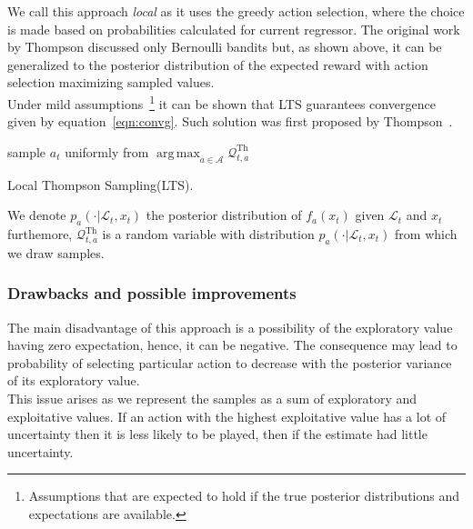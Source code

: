 \documentclass[12pt, a4paper, pdflatex, leqno, twoside]{report}
\begin{document}
We call this approach \emph{local} as it uses the greedy action selection, where the 
choice is made based on probabilities calculated for current regressor. The 
original work by Thompson discussed only Bernoulli bandits but, as shown above, 
it can be generalized to the posterior distribution of the expected 
reward with action selection maximizing sampled values.\\

Under mild assumptions~\footnote{Assumptions that are expected to hold if the 
true posterior distributions and expectations are available.} it can be shown 
that LTS guarantees convergence given by equation~\ref{eqn:convg}. Such 
solution was first proposed by Thompson~\citep{thompson:biom33}.\\


\vspace{2cm}
\begin{algorithm}[H]
  sample $a_t$ uniformly from $\operatorname{arg\,max}_{a \in \mathscr{A}} 
\mathscr{Q}^\text{Th}_{t,a}$ \;
 \caption{Local Thompson Sampling(LTS).\label{al:LTS}}
\end{algorithm}
\vspace{2cm}

We denote $p_a(\cdot | \mathscr{L}_t, x_t)$ the posterior distribution of 
$f_a(x_t)$ given $\mathscr{L}_t$ and $x_t$ furthemore, $\mathscr{Q}^\text{Th}_{t,a}$ is a  
random variable with distribution $p_a(\cdot | \mathscr{L}_t, x_t)$ from which we 
draw samples.\\


\subsubsection{Drawbacks and possible improvements}
The main disadvantage of this approach is a possibility of the exploratory value having 
zero expectation, hence, it can be negative. The consequence may lead to 
probability of selecting particular action to decrease with the posterior 
variance of its exploratory value.\\
This issue arises as we represent the samples as a sum of exploratory and 
exploitative values. If an action with the highest exploitative value 
has a lot of uncertainty then it is less likely to be played, then if the 
estimate had little uncertainty.\\
\end{document}
